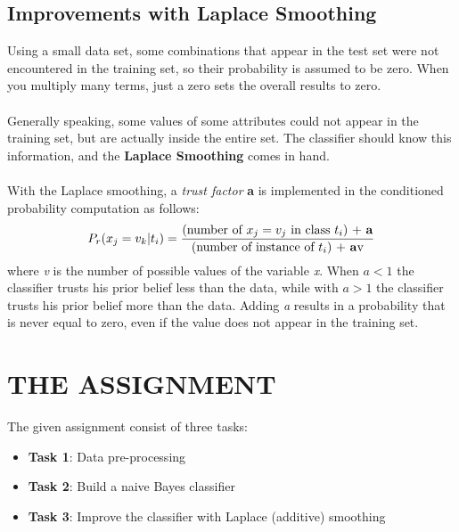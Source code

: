 \documentclass[10pt]{article}
\begin{document}
\subsection{Improvements with Laplace Smoothing}
Using a small data set, some combinations that appear in
the test set were not encountered in the training set, so their
probability is assumed to be zero. When you multiply many
terms, just a zero sets the overall results to zero.\\\\
Generally speaking, some values of some attributes could
not appear in the training set, but are actually inside the
entire set. The classifier should know this information, and
the \textbf{Laplace Smoothing} comes in hand.\\\\With the Laplace smoothing, a \textit{trust factor} \textbf{a} is implemented
in the conditioned probability computation as follows:
\begin{equation}
     P_r(x_j = v_k|t_i) = \frac{\text{(number of $x_j = v_j$ in class $t_i$) + \textbf{a}}}{\text{(number of instance of $t_i$) + \textbf{a}v}}
\end{equation}
where \textit{v} is the number of possible values of the variable \textit{x}.
When $a < 1$ the classifier trusts his prior belief less than
the data, while with $a > 1$ the classifier trusts his prior belief
more than the data. Adding \textit{a} results in a probability that is
never equal to zero, even if the value does not appear in the
training set.


\section{THE ASSIGNMENT}
The given assignment consist of three tasks:
\begin{itemize}
 \item \textbf{Task 1}: Data pre-processing
 \item \textbf{Task 2}: Build a naive Bayes classifier
 \item \textbf{Task 3}: Improve the classifier with Laplace (additive) smoothing
 \end{itemize} 
\end{document}
